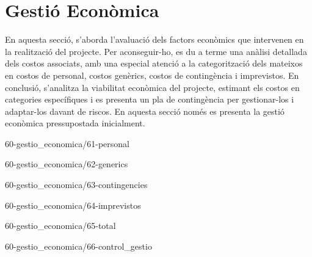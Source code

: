 \chapter{Gestió Econòmica}
En aquesta secció, s'aborda l'avaluació dels factors econòmics que intervenen en la realització del projecte. Per aconseguir-ho, es du a terme una anàlisi detallada dels costos associats, amb una especial atenció a la categorització dels mateixos en costos de personal, costos genèrics, costos de contingència i imprevistos. En conclusió, s'analitza la viabilitat econòmica del projecte, estimant els costos en categories específiques i es presenta un pla de contingència per gestionar-los i adaptar-los davant de riscos. En aquesta secció només es presenta la gestió econòmica pressupostada inicialment.

{60-gestio_economica/61-personal}

{60-gestio_economica/62-generics}

{60-gestio_economica/63-contingencies}

{60-gestio_economica/64-imprevistos}

{60-gestio_economica/65-total}

{60-gestio_economica/66-control_gestio}
